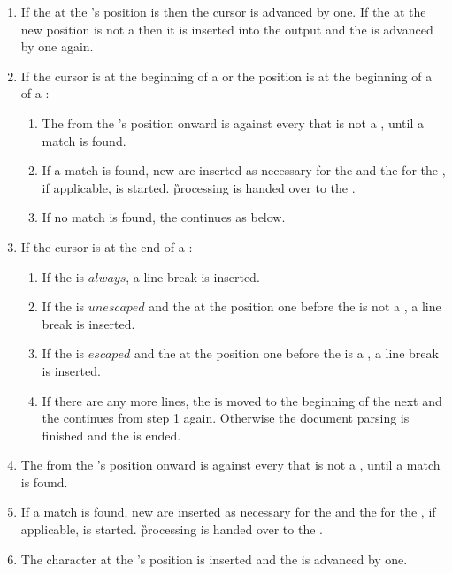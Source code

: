 \begin{enumerate}
\item If the  at the 's position is  then the cursor is advanced by one. If the  at the new position is not a  then it is inserted into the output  and the  is advanced by one again.
\item If the cursor is at the beginning of a  or the position is at the beginning of a  of a :
  \begin{enumerate}
  \item The  from the 's position onward is  against every  that is not a , until a match is found.
  \item If a match is found, new  are inserted as necessary for the  and the  for the , if applicable, is started. \G{processing} is handed over to the .
  \item If no match is found, the  continues as below.
  \end{enumerate}
\item If the cursor is at the end of a :
  \begin{enumerate}
  \item If the  is \inline$always$, a line break is inserted.
  \item If the  is \inline$unescaped$ and the  at the position one before the  is not a , a line break is inserted.
  \item If the  is \inline$escaped$ and the  at the position one before the  is a , a line break is inserted.
  \item If there are any more lines, the  is moved to the beginning of the next  and the  continues from step 1 again. Otherwise the document parsing is finished and the   is ended.
  \end{enumerate}
\item The  from the 's position onward is  against every  that is not a , until a match is found.
\item If a match is found, new  are inserted as necessary for the  and the  for the , if applicable, is started. \G{processing} is handed over to the .
\item The character at the 's position is inserted and the  is advanced by one.
\end{enumerate}

